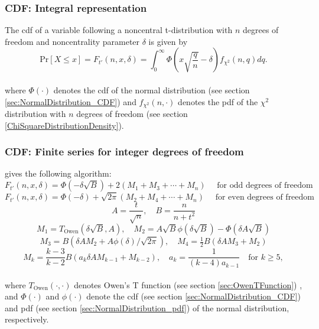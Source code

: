 \subsubsection{CDF: Integral representation}
The cdf of a variable following a noncentral  t-distribution with $n$ degrees of freedom and noncentrality parameter $\delta$ is given by \citep{Witkovsky_2013}
\begin{equation}
\text{Pr}\left[X \le x\right] = F_{t'}\left(n,x, \delta\right) = \int_{0}^{\infty} \Phi \left(x \sqrt{\frac{q}{n}} -\delta\right) f_{\chi^2}(n, q) dq.
\end{equation} \\
where $\Phi(\cdot)$ denotes the cdf of the normal distribution (see section \ref{sec:NormalDistribution_CDF}) and $f_{\chi^2}(n,\cdot)$ denotes the pdf of the $\chi^2$ distribution with $n$ degrees of freedom (see section \ref{ChiSquareDistributionDensity}).



\subsubsection{CDF: Finite series for integer degrees of freedom}
\cite{owen_survey_1968} gives the following algorithm:
\begin{equation}
F_{t'}\left(n,x, \delta\right) =  \Phi(-\delta \sqrt{B}) + 2(M_1+M_3 + \cdots + M_n) \quad \text{ for odd degrees of freedom}
\end{equation}
\begin{equation}
F_{t'}\left(n,x, \delta\right) =  \Phi(-\delta) + \sqrt{2\pi}(M_2+M_4 + \cdots + M_n) \quad \text{ for even degrees of freedom}
\end{equation}
\begin{equation}
A=\frac{t}{\sqrt{n}},\quad B=\frac{n}{n+t^2}
\end{equation}
\begin{equation}
M_1 = T_{\text{Owen}}(\delta \sqrt{B}, A), \quad M_2 = A \sqrt{B} \phi(\delta \sqrt{B})-\Phi(\delta A \sqrt{B})
\end{equation}
\begin{equation}
M_3=B(\delta A M_2 + A \phi(\delta)/\sqrt{2\pi}), \quad M_4= \tfrac{1}{2}B(\delta A M_3 + M_2)
\end{equation}
\begin{equation}
M_k= \frac{k-3}{k-2}B(a_k \delta A M_{k-1} + M_{k-2}), \quad a_k = \frac{1}{(k-4)a_{k-1}} \quad \text{for } k \geq 5,
\end{equation} \\
where $T_{\text{Owen}}(\cdot,\cdot)$ denotes Owen's T function 
(see section \ref{sec:OwenTFunction})
, and $\Phi(\cdot)$ and $\phi(\cdot)$ denote the cdf (see section \ref{sec:NormalDistribution_CDF}) and pdf (see section \ref{sec:NormalDistribution_pdf}) of the normal distribution, respectively.






